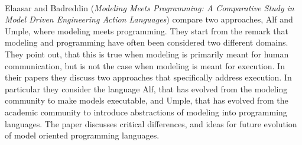 

\ \hline \ %

Elaasar and Badreddin
\cite{isola-2016-elaasar}
({\em Modeling Meets Programming: A Comparative Study in
Model Driven Engineering Action Languages})
compare two approaches, Alf and Umple, where modeling meets programming. They start from the remark that modeling and programming have often been considered two different domains. They point out, that this is true when modeling is primarily meant for human communication, but is not the case when modeling is meant for execution. In their papers they discuss two approaches that specifically address execution. In particular they consider the language Alf, that has evolved from the modeling community to make models executable, and Umple, that has evolved from the academic community to introduce abstractions of modeling into programming languages. The paper discusses critical differences, and ideas for future evolution of model oriented programming languages.
 
\done{}